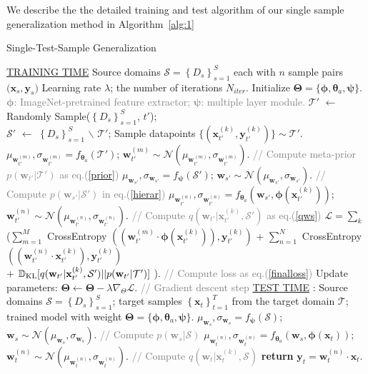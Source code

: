 \documentclass{article} \usepackage[table]{xcolor}
\newcommand{\x}{\mathbf{x}}
\newcommand{\y}{\mathbf{y}}
\newcommand{\w}{\mathbf{w}}
\newcommand{\btheta}{\boldsymbol{\theta}}
\newcommand{\bphi}{\boldsymbol{\phi}}
\newcommand{\bpsi}{\boldsymbol{\psi}}
\begin{document}
We describe the the detailed training and test algorithm of our single sample generalization method in Algorithm~\ref{alg:1}
\begin{algorithm}[h]
\small
\caption{Single-Test-Sample Generalization}
\label{alg:1}
\begin{algorithmic}
\STATE \underline{TRAINING TIME}
 Source domains $\mathcal{S}=\left \{ D_{s} \right \}^{S}_{s=1}$ each with $n$ sample pairs ${(\x_s, \y_s})$
 Learning rate $\lambda$; the number of iterations $N_{iter}$.
\STATE Initialize $\boldsymbol{\Theta} = \{\bphi, \btheta_{a}, \bpsi \}$. \textcolor{gray}{$\bphi$: ImageNet-pretrained feature extractor; 
$\bpsi$: multiple layer module.}
\STATE $\mathcal{T'}$ $\leftarrow$ Randomly Sample($\left \{ D_{s} \right \}^{S}_{s=1}$, $t'$); 
\\
$\mathcal{S'}$ $\leftarrow$ $\left \{ D_{s} \right \}^{S}_{s=1}$ $\backslash$ $\mathcal{T'}$;
\STATE Sample datapoints $\{(\mathbf{x}_{t'}^{(k)}, \mathbf{y}_{t'}^{(k)})\} \sim \mathcal{T'}$.
\STATE $\mu_{\w^{(m)}_{t'}}, \sigma_{\w^{(m)}_{t'}} = f_{\btheta_{a}}(\mathcal{T'})$; $\w^{(m)}_{t'} \sim \mathcal{N}(\mu_{\w^{(m)}_{t'}}, \sigma_{\w^{(m)}_{t'}})$. \textcolor{gray}{// Compute meta-prior $p(\w_{t'}|\mathcal{T'})$ as eq.(\ref{prior})}
\STATE $\mu_{\w_{s'}}, \sigma_{\w_{s'}} = f_{\bpsi}(\mathcal{S'})$; $\w_{s'} \sim \mathcal{N}(\mu_{\w_{s'}}, \sigma_{\w_{s'}})$. \textcolor{gray}{// Compute $p(\w_{s'}|\mathcal{S'})$ in eq.(\ref{hierar})}
\STATE $\mu_{\w^{(n)}_{t'}}, \sigma_{\w^{(n)}_{t'}} = f_{\btheta_{a}}(\w_{s'}, \bphi(\x^{(k)}_{t'}))$; $\w^{(n)}_{t'} \sim \mathcal{N}(\mu_{\w^{(n)}_{t'}}, \sigma_{\w^{(n)}_{t'}})$. \textcolor{gray}{// Compute $q(\w_{t'}|\x^{(k)}_{t'}, \mathcal{S'})$ as eq.(\ref{qws})}
\STATE $\mathcal{L}=\sum\limits_{k}$ \Big($\sum\limits_{m=1}^{M} $ CrossEntropy $((\w^{(m)}_{t'}\cdot \bphi(\x^{(k)}_{t'})), \mathbf{y}_{t'}^{(k)})$ + $\sum\limits_{n=1}^{N} $ CrossEntropy $((\w^{(n)}_{t'}\cdot\x^{(k)}_{t'}), \mathbf{y}_{t'}^{(k)})$ 
\\ \qquad + $\mathbb{D}_{\rm{KL}} [q(\w_{t'}|\x^{(k)}_{t'}, \mathcal{S'})||p(\w_{t'}|\mathcal{T'})]$ \Big). \textcolor{gray}{// Compute loss as eq.(\ref{finalloss})}
\STATE Update parameters: $\boldsymbol{\Theta} \leftarrow \boldsymbol{\Theta} -\lambda \nabla_{\Theta} \mathcal{L}$. \textcolor{gray}{// Gradient descent step}
\ENDFOR
\STATE {\hrulefill}
\STATE \underline{TEST TIME}
: Source domains $\mathcal{S}=\left \{ D_{s} \right \}^{S}_{s=1}$; target samples $\left \{ \x_{t} \right \}^{T}_{t=1}$ from the target domain $\mathcal{T}$; trained model with weight $\boldsymbol{\Theta} = \{\bphi, \btheta_{a}, \bpsi\}$.
\STATE $\mu_{\w_{s}}, \sigma_{\w_{s}} = f_{\bpsi}(\mathcal{S})$; $\w_{s} \sim \mathcal{N}(\mu_{\w_{s}}, \sigma_{\w_{s}})$. \textcolor{gray}{// Compute $p(\w_{s}|\mathcal{S})$}
\STATE $\mu_{\w^{(n)}_{t}}, \sigma_{\w^{(n)}_{t}} = f_{\btheta_{a}}(\w_{s}, \bphi(\x_{t}))$; $\w^{(n)}_{t} \sim \mathcal{N}(\mu_{\w^{(n)}_{t}}, \sigma_{\w^{(n)}_{t}})$. \textcolor{gray}{// Compute $q(\w_{t}|\x^{(k)}_{t}, \mathcal{S})$}
\STATE \textbf{return} $\y_{t} = \w^{(n)}_{t} \cdot \x_{t}$.
\end{algorithmic}
\end{algorithm}
\end{document}
